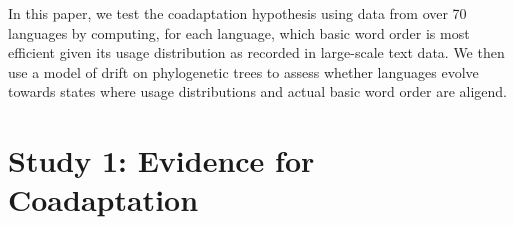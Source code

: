 \documentclass[11pt,a4paper]{article}
\newcommand\comment[1]{{\color{red}#1}}
\newcommand\mhahn[1]{{\color{red}(#1)}}
\begin{document}


In this paper, we test the coadaptation hypothesis using data from over 70 languages by computing, for each language, which basic word order is most efficient given its usage distribution as recorded in large-scale text data.
We then use a model of drift on phylogenetic trees to assess whether languages evolve towards states where usage distributions and actual basic word order are aligend.



















\section{Study 1: Evidence for Coadaptation}
\end{document}
